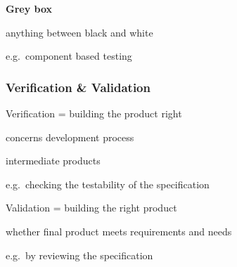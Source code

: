 \textbf{Grey box}
\begin{itemize*}
	\item anything between black and white
	\item e.g.\ component based testing
\end{itemize*}

\subsubsection{Verification \& Validation}
\begin{itemize*}
	\item Verification = building the product right
	\begin{itemize*}
		\item concerns development process
		\item intermediate products
		\item e.g.\ checking the testability of the specification
	\end{itemize*}
	\item Validation = building the right product
	\begin{itemize*}
		\item whether final product meets requirements and needs
		\item e.g.\ by reviewing the specification
	\end{itemize*}
\end{itemize*}




